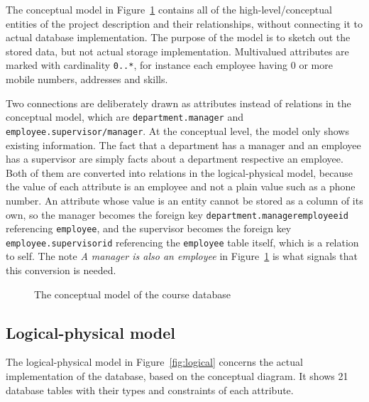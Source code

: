 \documentclass[a4paper]{scrartcl}
\newcommand{\diagrampage}[3]{%
  \newgeometry{margin=10mm}%
  \begin{landscape}%
    \vspace*{\fill}
    \begin{figure}[h!]
      \centering
      
      \caption{#2}
      \label{#3}
    \end{figure}%
    \vspace*{\fill}
  \end{landscape}%
  \restoregeometry%
}
\renewcommand{\_}{\textunderscore\allowbreak}
\begin{document}
The conceptual model in Figure~\ref{fig:conceptual} contains all of the high-level/conceptual entities of the project description and their relationships, without connecting it to actual database implementation. The purpose of the model is to sketch out the stored data, but not actual storage implementation. Multivalued attributes are marked with cardinality \texttt{0..*}, for instance each employee having 0 or more mobile numbers, addresses and skills.

Two connections are deliberately drawn as attributes instead of relations in the conceptual model, which are \texttt{department.manager} and \texttt{employee.supervisor/manager}. At the conceptual level, the model only shows existing information. The fact that a department has a manager and an employee has a supervisor are simply facts about a department respective an employee. Both of them are converted into relations in the logical-physical model, because the value of each attribute is an employee and not a plain value such as a phone number. An attribute whose value is an entity cannot be stored as a column of its own, so the manager becomes the foreign key \texttt{department.manager\_employee\_id} referencing \texttt{employee}, and the supervisor becomes the foreign key \texttt{employee.supervisor\_id} referencing the \texttt{employee} table itself, which is a relation to self. The note \textit{A manager is also an employee} in Figure~\ref{fig:conceptual} is what signals that this conversion is needed.

\diagrampage{diagrams/conceptual}{The conceptual model of the course database}{fig:conceptual}

\subsection{Logical-physical model}

The logical-physical model in Figure~\ref{fig:logical} concerns the actual implementation of the database, based on the conceptual diagram. It shows 21 database tables with their types and constraints of each attribute.
\end{document}
